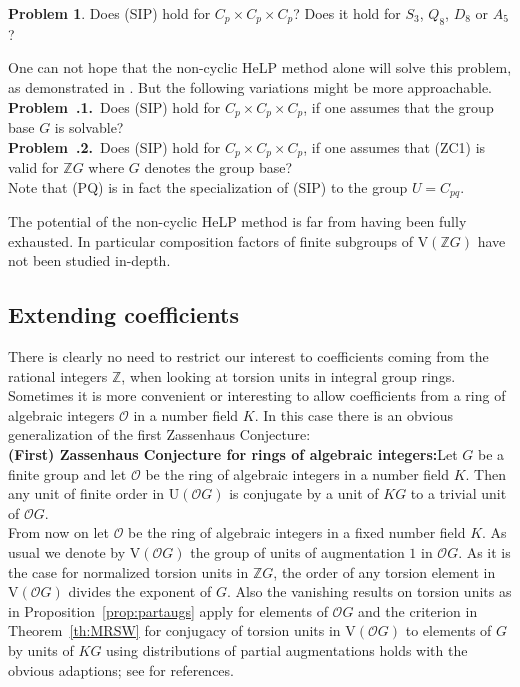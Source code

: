 \documentclass[10pt,a4paper,reqno]{amsart}
\theoremstyle{definition}
\newtheorem{problem}[theorem]{Problem}
\theoremstyle{remark}
\newcommand{\U}{\mathrm{U}}
\newcommand{\V}{\mathrm{V}}
\newcommand{\ZZ}{\mathbb{Z}}
\begin{document}
\begin{problem} Does (SIP) hold for $C_p \times C_p \times C_p$? Does it hold for $S_3$, $Q_8$, $D_8$ or $A_5$? \end{problem}

One can not hope that the non-cyclic HeLP method alone will solve this problem, as demonstrated in \cite[Proposition 4.3]{KM17}. But the following variations might be more approachable.\\

\noindent\textbf{Problem~\thetheorem.1.}\ Does (SIP) hold for $C_p \times C_p \times C_p$, if one assumes that the group base $G$ is solvable?\\

\noindent\textbf{Problem~\thetheorem.2.}\  Does (SIP) hold for $C_p \times C_p \times C_p$, if one assumes that (ZC1) is valid for $\mathbb{Z}G$ where $G$ denotes the group base?\\

Note that (PQ) is in fact the specialization of (SIP) to the group $U = C_{pq}$.

The potential of the non-cyclic HeLP method is far from having been fully exhausted. In particular composition factors of finite subgroups of $\V(\ZZ G)$ have not been studied in-depth.

\subsection{Extending coefficients}\label{subsect:extcoeff}

There is clearly no need to restrict our interest to coefficients coming from the rational integers $\mathbb{Z}$, when looking at torsion units in integral group rings. Sometimes it is more convenient or interesting to allow coefficients from a ring of algebraic integers $\mathcal{O}$ in a number field $K$. In this case there is an obvious generalization of the first Zassenhaus Conjecture:\\

 \noindent\textbf{(First) Zassenhaus Conjecture for rings of algebraic integers:}\quad  Let $G$ be a finite group and let $\mathcal{O}$ be the ring of algebraic integers in a number field $K$. Then any unit of finite order in $\U(\mathcal{O} G)$ is conjugate by a unit of $KG$ to a trivial unit of $\mathcal{O} G$. \\
 
 From now on let $\mathcal{O}$ be the ring of algebraic integers in a fixed number field $K$.  As usual we denote by $\V(\mathcal{O}G)$ the group of units of augmentation $1$ in $\mathcal{O}G$. As it is the case for normalized torsion units in $\ZZ G$, the order of any torsion element in $\V(\mathcal{O}G)$ divides the exponent of $G$. Also the vanishing results on torsion units as in Proposition~\ref{prop:partaugs} apply for elements of $\mathcal{O}G$ and the criterion in Theorem~\ref{th:MRSW} for conjugacy of torsion units in $\V(\mathcal{O}G)$ to elements of $G$ by units of $KG$ using distributions of partial augmentations holds with the obvious adaptions; see \cite[5.4]{BKS20} for references.
\end{document}
